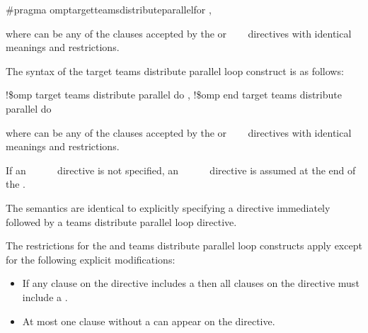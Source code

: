 {{{{\begin{boxedcode}[fontsize=\small]
\#pragma omp\plc{ }target\plc{ }teams\plc{ }distribute\plc{ }parallel\plc{ }for \plc{[clause[ [},\plc{] clause] ... ] new-line}
\end{boxedcode}

where  can be any of the clauses accepted by the  or
~~~ directives with identical 
meanings and restrictions.
\ccppspecificend

\begin{samepage}
\fortranspecificstart
The syntax of the target teams distribute parallel loop construct is as follows:

\begin{boxedcode}
!\$omp target teams distribute parallel do \plc{[clause[ [},\plc{] clause] ... ]}
\plc{[}!\$omp end target teams distribute parallel do\plc{]}
\end{boxedcode}
\end{samepage}

where  can be any of the clauses accepted by the  or 
~~~ directives with 
identical meanings and restrictions.

If an ~~~~~ directive is not specified, an 
~~~~~ 
directive is assumed at the end of the .
\fortranspecificend

\descr
The semantics are identical to explicitly specifying a  
directive immediately followed by a teams distribute parallel loop directive.


\restrictions
The restrictions for the  and teams distribute parallel 
loop constructs apply except for the following explicit modifications:

\begin{itemize}
\item If any  clause on the directive includes a
       then all  clauses 
      on the directive must include a .

\item At most one  clause without a 
       can appear on the directive.


\end{itemize}}}}}
